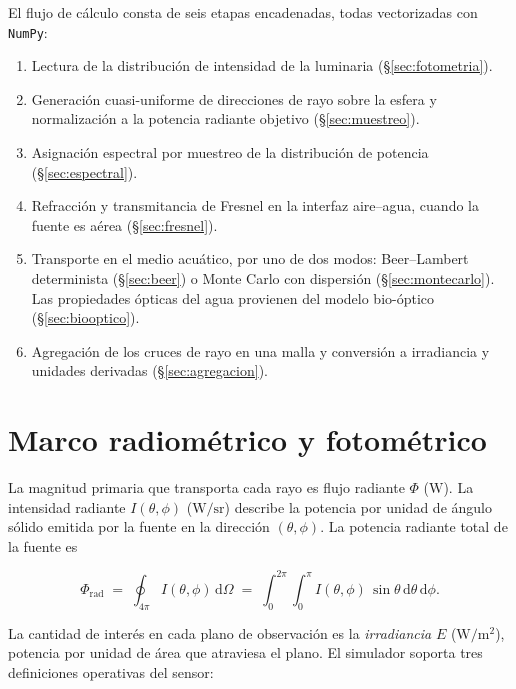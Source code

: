 \documentclass[11pt,a4paper]{article}
\newcommand{\si}[1]{\ensuremath{#1}}
\newcommand{\watt}{\mathrm{W}}
\newcommand{\meter}{\mathrm{m}}
\newcommand{\steradian}{\mathrm{sr}}
\newcommand{\per}{/}
\renewcommand{\square}[1]{#1^{2}}
\newcommand{\code}[1]{\texttt{#1}}
\begin{document}
El flujo de cálculo consta de seis etapas encadenadas, todas vectorizadas con
\code{NumPy}:
\begin{enumerate}[itemsep=2pt]
  \item Lectura de la distribución de intensidad de la luminaria
        (\S\ref{sec:fotometria}).
  \item Generación cuasi-uniforme de direcciones de rayo sobre la esfera y
        normalización a la potencia radiante objetivo (\S\ref{sec:muestreo}).
  \item Asignación espectral por muestreo de la distribución de potencia
        (\S\ref{sec:espectral}).
  \item Refracción y transmitancia de Fresnel en la interfaz aire--agua, cuando la
        fuente es aérea (\S\ref{sec:fresnel}).
  \item Transporte en el medio acuático, por uno de dos modos: Beer--Lambert
        determinista (\S\ref{sec:beer}) o Monte Carlo con dispersión
        (\S\ref{sec:montecarlo}). Las propiedades ópticas del agua provienen del
        modelo bio-óptico (\S\ref{sec:biooptico}).
  \item Agregación de los cruces de rayo en una malla y conversión a irradiancia y
        unidades derivadas (\S\ref{sec:agregacion}).
\end{enumerate}

\section{Marco radiométrico y fotométrico}\label{sec:radiometria}

La magnitud primaria que transporta cada rayo es flujo radiante $\Phi$
(\si{\watt}). La intensidad radiante $I(\theta,\phi)$ (\si{\watt\per\steradian})
describe la potencia por unidad de ángulo sólido emitida por la fuente en la
dirección $(\theta,\phi)$. La potencia radiante total de la fuente es

\begin{equation}
\Phi_\text{rad} \;=\; \oint_{4\pi} I(\theta,\phi)\,\mathrm{d}\Omega
\;=\; \int_0^{2\pi}\!\!\int_0^{\pi} I(\theta,\phi)\,\sin\theta\,\mathrm{d}\theta\,\mathrm{d}\phi .
\label{eq:flujo}
\end{equation}

La cantidad de interés en cada plano de observación es la \emph{irradiancia} $E$
(\si{\watt\per\square\meter}), potencia por unidad de área que atraviesa el plano.
El simulador soporta tres definiciones operativas del sensor:
\end{document}
